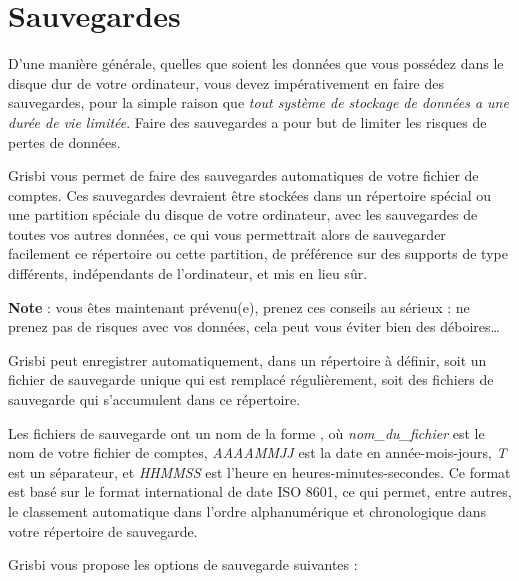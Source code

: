 \section{Sauvegardes\label{datamanagement-backup}}


D'une manière générale, quelles que soient les données que vous possédez dans le disque dur de votre ordinateur, vous devez impérativement en faire des sauvegardes, pour la simple raison que \emph{tout système de stockage de données a une durée de vie limitée}. Faire des sauvegardes a pour but de limiter les risques de pertes de données. 

Grisbi vous permet de faire des sauvegardes automatiques de votre fichier de comptes. Ces sauvegardes devraient être stockées dans un répertoire spécial ou une \gls{partition} spéciale du disque de votre ordinateur, avec les sauvegardes de toutes vos autres données, ce qui vous permettrait alors de sauvegarder facilement ce répertoire ou cette partition, de préférence sur des supports de type différents, indépendants de l'ordinateur, et mis en lieu sûr.

\textbf{Note} : vous êtes maintenant prévenu(e), prenez ces conseils au sérieux : ne prenez pas de risques avec vos données, cela peut vous éviter bien des déboires\ldots

Grisbi peut enregistrer automatiquement, dans un répertoire à définir, soit un fichier de sauvegarde unique qui est remplacé régulièrement, soit des fichiers de sauvegarde qui s'accumulent dans ce répertoire.

Les fichiers de sauvegarde ont un nom de la forme , où \emph{nom\_du\_fichier} est le nom de votre fichier de comptes, \emph{AAAAMMJJ} est la date en année-mois-jours, \emph{T} est un séparateur, et \emph{HHMMSS} est l'heure en heures-minutes-secondes. Ce format est basé sur le format international de date ISO 8601, ce qui permet, entre autres, le classement automatique dans l'ordre alphanumérique et chronologique dans votre répertoire de sauvegarde.

 Grisbi vous propose les options de sauvegarde suivantes :

